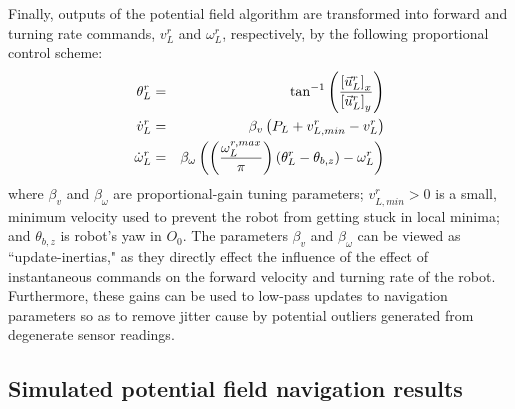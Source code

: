 			Finally, outputs of the potential field algorithm are transformed into forward and turning rate commands, ${v}_{L}^{r}$ and $\omega_{L}^{r}$, respectively, by the following proportional control scheme:
				\begin{eqnarray}
					\theta_{L}^{r} 			&=& \tan^{-1}\left( \frac{ \left[\vec{u}^{r}_{L}\right]_{x} }{ \left[\vec{u}^{r}_{L}\right]_{y} } \right) \nonumber\\
					\dot{v}_{L}^{r} 		&=& \beta_{v} \left( P_{L} + v_{L,min}^{r} - v_{L}^{r} \right) \nonumber \\
					\dot{\omega}_{L}^{r} 	&=& \beta_{\omega} \left( \left( \frac{ \omega_{L}^{r,max} }{\pi} \right) \left(  \theta_{L}^{r} - \theta_{b,z} \right) - \omega_{L}^{r} \right)
				\end{eqnarray}
			where $\beta_{v}$ and $\beta_{\omega}$ are proportional-gain tuning parameters; $v_{L,min}^{r}>0$ is a small, minimum velocity used to prevent the robot from getting stuck in local minima; and $\theta_{b,z}$ is robot's yaw in $O_{0}$. The parameters $\beta_{v}$ and $\beta_{\omega}$ can be viewed as ``update-inertias," as they directly effect the influence of the effect of instantaneous commands on the forward velocity and turning rate of the robot. Furthermore, these gains can be used to low-pass updates to navigation parameters so as to remove jitter cause by potential outliers generated from degenerate sensor readings.


		\subsection{Simulated potential field navigation results}

